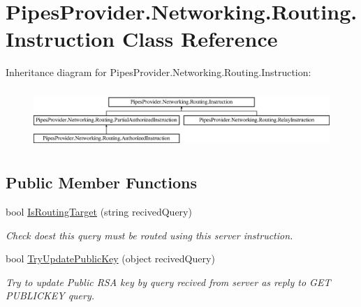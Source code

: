 \hypertarget{class_pipes_provider_1_1_networking_1_1_routing_1_1_instruction}{}\section{Pipes\+Provider.\+Networking.\+Routing.\+Instruction Class Reference}
\label{class_pipes_provider_1_1_networking_1_1_routing_1_1_instruction}


 


Inheritance diagram for Pipes\+Provider.\+Networking.\+Routing.\+Instruction\+:\begin{figure}[H]
\begin{center}
\leavevmode
\includegraphics[height=2.258065cm]{d5/d2e/class_pipes_provider_1_1_networking_1_1_routing_1_1_instruction}
\end{center}
\end{figure}
\subsection*{Public Member Functions}
\begin{DoxyCompactItemize}
\item 
bool \mbox{\hyperlink{class_pipes_provider_1_1_networking_1_1_routing_1_1_instruction_a376135eac06c59b1df8d2f5d1617bed9}{Is\+Routing\+Target}} (string recived\+Query)
\begin{DoxyCompactList}\small\item\em Check doest this query must be routed using this server instruction. \end{DoxyCompactList}\item 
bool \mbox{\hyperlink{class_pipes_provider_1_1_networking_1_1_routing_1_1_instruction_a04ee08d3b41785e88679c6870c392266}{Try\+Update\+Public\+Key}} (object recived\+Query)
\begin{DoxyCompactList}\small\item\em Try to update Public R\+SA key by query recived from server as reply to G\+ET P\+U\+B\+L\+I\+C\+K\+EY query. \end{DoxyCompactList}\end{DoxyCompactItemize}
